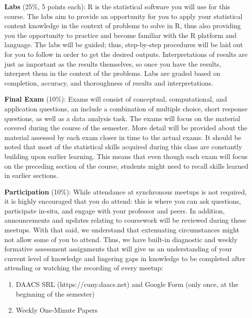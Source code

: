\documentclass[
  letterpaper,
  DIV=11,
  numbers=noendperiod]{scrartcl}
\providecommand{\tightlist}{%
  \setlength{\itemsep}{0pt}\setlength{\parskip}{0pt}}\usepackage{longtable,booktabs,array}
\begin{document}
\textbf{Labs} (25\%, 5 points each): R is the statistical software you
will use for this course. The labs aim to provide an opportunity for you
to apply your statistical content knowledge in the context of problems
to solve in R, thus also providing you the opportunity to practice and
become familiar with the R platform and language. The labs will be
guided; thus, step-by-step procedures will be laid out for you to follow
in order to get the desired outputs. Interpretations of results are just
as important as the results themselves, so once you have the results,
interpret them in the context of the problems. Labs are graded based on
completion, accuracy, and thoroughness of results and interpretations.

\textbf{Final Exam} (10\%): Exams will consist of conceptual,
computational, and application questions, an include a combination of
multiple choice, short response questions, as well as a data analysis
task. The exams will focus on the material covered during the course of
the semester. More detail will be provided about the material assessed
by each exam closer in time to the actual exams. It should be noted that
most of the statistical skills acquired during this class are constantly
building upon earlier learning. This means that even though each exam
will focus on the preceding section of the course, students might need
to recall skills learned in earlier sections.

\textbf{Participation} (10\%): While attendance at synchronous meetups
is not required, it is highly encouraged that you do attend: this is
where you can ask questions, participate in-situ, and engage with your
professor and peers. In addition, announcements and updates relating to
coursework will be reviewed during these meetups. With that said, we
understand that extenuating circumstances might not allow some of you to
attend. Thus, we have built-in diagnostic and weekly formative
assessment assignments that will give us an understanding of your
current level of knowledge and lingering gaps in knowledge to be
completed after attending or watching the recording of every meetup:

\begin{enumerate}
\def\labelenumi{\arabic{enumi}.}
\tightlist
\item
  DAACS SRL (https://cuny.daacs.net) and Google Form (only once, at the
  beginning of the semester)
\item
  Weekly One-Minute Papers
\end{enumerate}
\end{document}
